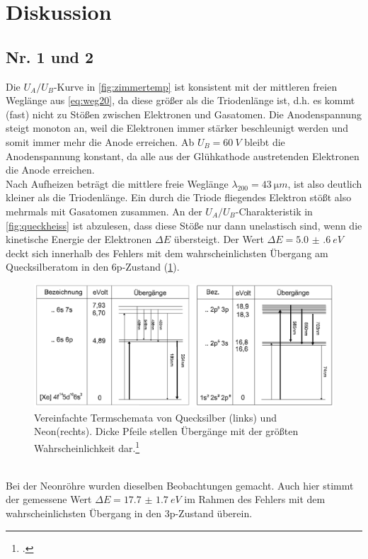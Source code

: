 \section{Diskussion}
\subsection{Nr. 1 und 2}
Die $U_A/U_B$-Kurve in \cref{fig:zimmertemp} ist konsistent mit der mittleren freien Weglänge aus \cref{eq:weg20}, da diese größer als die Triodenlänge ist, d.h. es kommt (fast) nicht zu Stößen zwischen Elektronen und Gasatomen. Die Anodenspannung steigt monoton an, weil die Elektronen immer stärker beschleunigt werden und somit immer mehr die Anode erreichen. Ab $U_B=\SI{60}{V}$ bleibt die Anodenspannung konstant, da alle aus der Glühkathode austretenden Elektronen die Anode erreichen.\\

Nach Aufheizen beträgt die mittlere freie Weglänge $\lambda_{200}=\SI{43}{\micro m}$, ist also deutlich kleiner als die Triodenlänge. Ein durch die Triode fliegendes Elektron stößt also mehrmals mit Gasatomen zusammen. An der $U_A/U_B$-Charakteristik in \cref{fig:queckheiss} ist abzulesen, dass diese Stöße nur dann unelastisch sind, wenn die kinetische Energie der Elektronen $\Delta E$ übersteigt. Der Wert $\Delta E=\SI{5.0(6)}{eV}$ deckt sich innerhalb des Fehlers mit dem wahrscheinlichsten Übergang am Quecksilberatom in den 6p-Zustand (\cref{fig:schemata}).
\begin{figure}[!htb]
  \centering
  \includegraphics[width=.8\textwidth]{res/schemata}
  \caption{Vereinfachte Termschemata von Quecksilber (links) und Neon(rechts). Dicke Pfeile stellen Übergänge mit der größten Wahrscheinlichkeit dar.\footcite{anleitung-ss2015}}
  \label{fig:schemata}
\end{figure}
\\
Bei der Neonröhre wurden dieselben Beobachtungen gemacht. Auch hier stimmt der gemessene Wert $\Delta E=\SI{17.7(17)}{eV}$ im Rahmen des Fehlers mit dem wahrscheinlichsten Übergang in den 3p-Zustand überein.

